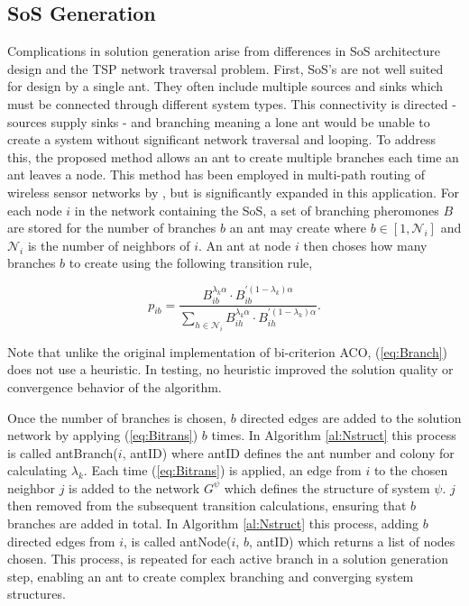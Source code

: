 \documentclass[preprint,12pt]{elsarticle}
\begin{document}
\subsection{SoS Generation} \label{sec:gen}


Complications in solution generation arise from differences in SoS architecture design and the TSP network traversal problem. First, SoS's are not well suited for design by a single ant. They often include multiple sources and sinks which must be connected through different system types. This connectivity is directed - sources supply sinks - and branching meaning a lone ant would be unable to create a system without significant network traversal and looping. To address this, the proposed method allows an ant to create multiple branches each time an ant leaves a node. This method has been employed in multi-path routing of wireless sensor networks by \cite{Yang2010}, but is significantly expanded in this application. For each node $i$ in the network containing the SoS, a set of branching pheromones $B$ are stored for the number of branches $b$ an ant may create where $b \in [1,\mathcal{N}_i]$ and $\mathcal{N}_i$ is the number of neighbors of $i$. An ant at node $i$ then choses how many branches $b$ to create using the following transition rule,

\begin{equation}
p_{ib}=\frac{B_{ib}^{\lambda_k\alpha}\cdot B_{ib}^{'(1-\lambda_k)\alpha}}{\sum_{h\in\mathcal{N}_i}B_{ih}^{\lambda_k\alpha}\cdot B_{ih}^{'(1-\lambda_k)\alpha}}.
\label{eq:Branch}
\end{equation}

\noindent Note that unlike the original implementation of bi-criterion ACO, (\ref{eq:Branch}) does not use a heuristic. In testing, no heuristic improved the solution quality or convergence behavior of the algorithm. 

Once the number of branches is chosen, $b$ directed edges are added to the solution network by applying (\ref{eq:Bitrans}) $b$ times. In Algorithm \ref{al:Nstruct} this process is called antBranch($i$, antID) where antID defines the ant number and colony for calculating $\lambda_k$. Each time (\ref{eq:Bitrans}) is applied, an edge from $i$ to the chosen neighbor $j$ is added to the network $G^\psi$ which defines the structure of system $\psi$. $j$ then removed from the subsequent transition calculations, ensuring that $b$ branches are added in total. In Algorithm \ref{al:Nstruct} this process, adding $b$ directed edges from $i$, is called antNode($i$, $b$, antID) which returns a list of nodes chosen. This process, is repeated for each active branch in a solution generation step, enabling an ant to create complex branching and converging system structures. 
\end{document}
